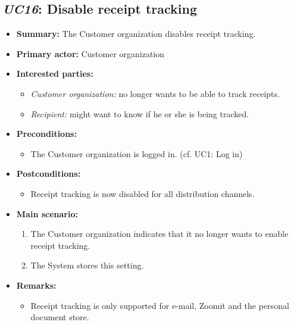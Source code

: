 \documentclass[a4paper,10pt]{article}
\begin{document}
\subsection{\emph{UC16}: Disable receipt tracking}
\begin{itemize}
	\item \textbf{Summary:} The Customer organization disables receipt tracking.
    \item \textbf{Primary actor:} Customer organization
    \item \textbf{Interested parties:} 
        \begin{itemize}
            \item \textit{Customer organization:} no longer wants to be able to track receipts.
            \item \textit{Recipient:} might want to know if he or she is being tracked.
        \end{itemize}

    \item \textbf{Preconditions:}
        \begin{itemize}
            \item The Customer organization is logged in. (cf. UC1: Log in)
        \end{itemize}

    \item \textbf{Postconditions:}
        \begin{itemize}
            \item Receipt tracking is now disabled for all distribution channels.
        \end{itemize}
        
    \item \textbf{Main scenario:} 
    \begin{enumerate}
       \item The Customer organization indicates that it no longer wants to enable receipt tracking.
       \item The System stores this setting.
    \end{enumerate}
    
    \item \textbf{Remarks:}
        \begin{itemize}
            \item Receipt tracking is only supported for e-mail, Zoomit and the personal document store.
        \end{itemize}
\end{itemize}
\end{document}
